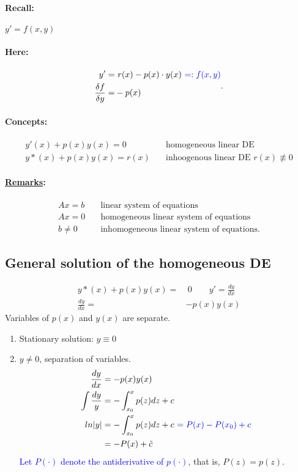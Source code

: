 \documentclass[]{article}
\begin{document}
		\paragraph{Recall:} $y'=f(x,y)$
		\paragraph{Here:} \[
		\begin{split}
			y'= &~ r(x)-p(x) \cdot y(x) \text{ \textcolor{blue}{$=:f(x,y)$}} \\
			\frac{\delta f}{\delta y} = & -p(x)
		\end{split}
		.\]
		\paragraph{Concepts:} 
		\[
		\begin{split}
			y'(x)+p(x)y(x) = 0\quad & \text{homogeneous linear DE} \\
			y*(x)+p(x)y(x)=r(x)\quad & \text{inhoogenous linear DE }r(x)\not\equiv0
		\end{split}
		\]
		\paragraph{ \underline{Remarks}:}
		\[
			\begin{split}
				Ax = b \quad & \text{linear system of equations} \\
				Ax=0\quad & \text{homogeneous linear system of equations} \\
				b\not=0\quad & \text{inhomogeneous linear system of equations.}
			\end{split}
		\]
		\subsection{General solution of the homogeneous DE}
		\[
		\begin{split}
			y*(x) + p(x)y(x)= & ~0\quad\quad y'= \frac{dy}{dx}  \\
			\frac{dy}{dx}= &-p(x)y(x) 
		\end{split}
		\]
		Variables of $p(x)$ and $y(x)$ are separate.
		\begin{enumerate}
			\item Stationary solution: $y\equiv 0$
			\item $y\not=0$, separation of variables.
				\[
				\begin{split}
				\frac{dy}{dx} & =-p(x)y(x) \\
				\int \frac{dy}{y} &= - \int_{x_0}^{x} p(z) dz+c\\
				ln|y| &=- \int_{x_0}^{x} p(z) dz+c \text{ \textcolor{blue}{$=P(x)-P(x_0)+c$}}\\
				      &=-P(x)+\tilde c
				\end{split}
				\]
				\textcolor{blue}{Let $P( \cdot )$ denote the antiderivative of $p( \cdot )$}, that is, $P
				(z)=p(z)$.
		\end{enumerate}
\end{document}
